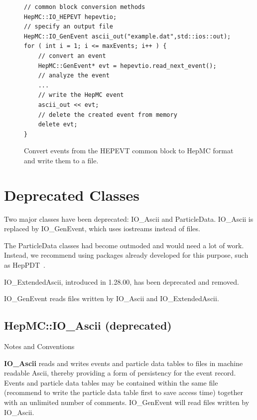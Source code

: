 \documentclass[11pt,letterpaper]{article}
\begin{document}
\begin{figure}[h]
\caption[IO\_HEPEVT and IO\_GenEvent exmple]
{\label{write_ascii} Convert events from the HEPEVT common block 
          to HepMC format and write them to a file. }
{\small \begin{verbatim}
// common block conversion methods
HepMC::IO_HEPEVT hepevtio;
// specify an output file
HepMC::IO_GenEvent ascii_out("example.dat",std::ios::out);
for ( int i = 1; i <= maxEvents; i++ ) {
    // convert an event
    HepMC::GenEvent* evt = hepevtio.read_next_event();
    // analyze the event
    ...
    // write the HepMC event
    ascii_out << evt;
    // delete the created event from memory
    delete evt;
}
\end{verbatim}}
\end{figure}

%
%

\section{Deprecated Classes}
\label{deprecated}

Two major classes have been deprecated: IO\_Ascii and ParticleData.
IO\_Ascii is replaced by IO\_GenEvent, which uses iostreams instead of files.

The ParticleData classes had become outmoded and would need a lot of
work.  Instead, we recommend using packages already developed for this
purpose, such as HepPDT~\cite{heppdt}.

IO\_ExtendedAscii, introduced in 1.28.00, has been deprecated and removed.

IO\_GenEvent reads files written by IO\_Ascii and IO\_ExtendedAscii.

%
%

\subsection{HepMC::IO\_Ascii (deprecated)}

\begin{myitemize}{Notes and Conventions}
 \item {\bf IO\_Ascii} reads and writes events and particle data
    tables to files in machine readable Ascii, thereby providing a
    form of persistency for the event record. Events and particle data
    tables may be contained within the same file (recommend to write
    the particle data table first to save access time) together with
    an unlimited number of comments. 
   IO\_GenEvent will read files written by IO\_Ascii.
\end{myitemize}
\end{document}
